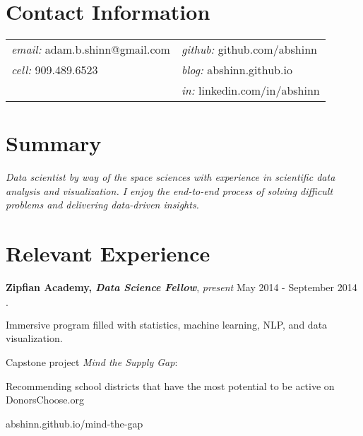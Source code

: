 \documentclass[margin,line]{res}
\newenvironment{list2}{
  \begin{list}{$\cdot$}{%
      \setlength{\itemsep}{0in}
      \setlength{\parsep}{0in} \setlength{\parskip}{0in}
      \setlength{\topsep}{0in} \setlength{\partopsep}{0in} 
      \setlength{\leftmargin}{0.2in}}}{\end{list}}
\begin{document}

\begin{resume}
\section{\sc Contact Information}
\vspace{.1 in}
\begin{tabular}{@{}p{3in}p{4in}}
{\it email:} adam.b.shinn@gmail.com & {\it github:} github.com/abshinn\\
{\it cell:} 909.489.6523 & {\it blog:} abshinn.github.io\\
& {\it in:} linkedin.com/in/abshinn\\
\end{tabular}


\section{\sc Summary}
{\it Data scientist by way of the space sciences with experience in scientific data analysis and visualization. I enjoy the end-to-end process of solving difficult problems and delivering data-driven insights.}


\section{\sc Relevant Experience}

{\bf Zipfian Academy, {\em Data Science Fellow}}, {\em present} \hfill {May 2014 - September 2014}\\
\vspace*{-.15in}
\begin{list2}
\item Immersive program filled with statistics, machine learning, NLP, and data visualization.
\item Capstone project {\em Mind the Supply Gap}:
\item[] Recommending school districts that have the most potential to be active on DonorsChoose.org
\item[] abshinn.github.io/mind-the-gap
\end{list2}


\end{resume}
\end{document}
